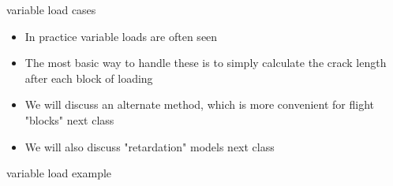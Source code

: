 \documentclass[10pt]{beamer}
\begin{document}
\begin{frame}{variable load cases}
	\begin{itemize}[<+->]
		\item In practice variable loads are often seen
		\item The most basic way to handle these is to simply calculate the crack length after each block of loading
		\item We will discuss an alternate method, which is more convenient for flight "blocks" next class
		\item We will also discuss "retardation" models next class
	\end{itemize}
\end{frame}

\begin{frame}{variable load example}
	
\end{frame}
\end{document}
